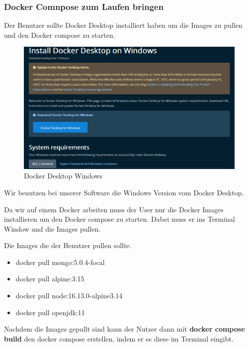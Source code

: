 \subsubsection{Docker Comnpose zum Laufen bringen}
Der Benutzer sollte Docker Desktop installiert haben um die Images zu pullen und den Docker compose zu starten.

\begin{figure}[H]
    \centering
    \includegraphics[width=1.0\textwidth]{bilder/installationshandbuch/Docker_Desktop.PNG}
    \caption{Docker Desktop Windows}
    \label{fig:Docker_Desktop_Windows}
\end{figure}
\noindent Wir benutzen bei unserer Software die Windows Version vom Docker Desktop.\newline

\noindent Da wir auf einem Docker arbeiten muss der User nur die Docker Images installieren um den Docker compose zu starten.\newline
Dabei muss er ins Terminal Window und die Images pullen.\newline


\noindent Die Images die der Benutzer pullen sollte.

\begin{itemize}
    \item docker pull mongo:5.0.4-focal
    \item docker pull alpine:3.15
    \item docker pull node:16.13.0-alpine3.14
    \item docker pull openjdk:11
\end{itemize}

\noindent Nachdem die Images gepullt sind kann der Nutzer dann mit \textbf{docker compose build} den docker compose erstellen, indem er es diese 
im Terminal eingibt.\newline

